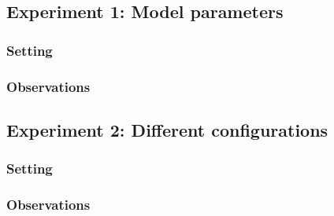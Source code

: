 \documentclass[11pt]{article}
\begin{document}
\subsection{Experiment 1: Model parameters}

\subsubsection{Setting}

\subsubsection{Observations}

\subsection{Experiment 2: Different configurations}

\subsubsection{Setting}

\subsubsection{Observations}
\end{document}
